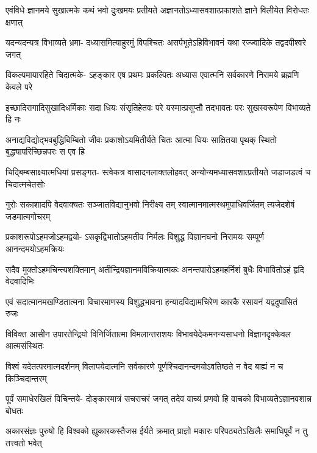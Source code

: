 \fourlineindentedshloka
{एवंविधे ज्ञानमये सुखात्मके}
{कथं भवो दुःखमयः प्रतीयते}
{अज्ञानतोऽध्यासवशात्प्रकाशते}
{ज्ञाने विलीयेत विरोधतः क्षणात्} %

\fourlineindentedshloka
{यदन्यदन्यत्र विभाव्यते भ्रमा-}
{दध्यासमित्याहुरमुं विपश्चितः}
{असर्पभूतेऽहिविभावनं यथा}
{रज्ज्वादिके तद्वदपीश्वरे जगत्} %

\fourlineindentedshloka
{विकल्पमायारहिते चिदात्मके-}
{ऽहङ्कार एष प्रथमः प्रकल्पितः}
{अध्यास एवात्मनि सर्वकारणे}
{निरामये ब्रह्मणि केवले परे} %

\fourlineindentedshloka
{इच्छादिरागादिसुखादिधर्मिकाः}
{सदा धियः संसृतिहेतवः परे}
{यस्मात्प्रसुप्तौ तदभावतः परः}
{सुखस्वरूपेण विभाव्यते हि नः} %

\fourlineindentedshloka
{अनाद्यविद्योद्भवबुद्धिबिम्बितो}
{जीवः प्रकाशोऽयमितीर्यते चितः}
{आत्मा धियः साक्षितया पृथक् स्थितो}
{बुद्ध्यापरिच्छिन्नपरः स एव हि} %

\fourlineindentedshloka
{चिद्बिम्बसाक्ष्यात्मधियां प्रसङ्गत-}
{स्त्वेकत्र वासादनलाक्तलोहवत्}
{अन्योन्यमध्यासवशात्प्रतीयते}
{जडाजडत्वं च चिदात्मचेतसोः} %

\fourlineindentedshloka
{गुरोः सकाशादपि वेदवाक्यतः}
{सञ्जातविद्यानुभवो निरीक्ष्य तम्}
{स्वात्मानमात्मस्थमुपाधिवर्जितम्}
{त्यजेदशेषं जडमात्मगोचरम्} %

\fourlineindentedshloka
{प्रकाशरूपोऽहमजोऽहमद्वयो-}
{ऽसकृद्विभातोऽहमतीव निर्मलः}
{विशुद्ध विज्ञानघनो निरामयः}
{सम्पूर्ण आनन्दमयोऽहमक्रियः} %

\fourlineindentedshloka
{सदैव मुक्तोऽहमचिन्त्यशक्तिमान्}
{अतीन्द्रियज्ञानमविक्रियात्मकः}
{अनन्तपारोऽहमहर्निशं बुधैः}
{विभावितोऽहं हृदि वेदवादिभिः} %

\fourlineindentedshloka
{एवं सदात्मानमखण्डितात्मना}
{विचारमाणस्य विशुद्धभावना}
{हन्यादविद्यामचिरेण कारकै}
{रसायनं यद्वदुपासितं रुजः} %

\fourlineindentedshloka
{विविक्त आसीन उपारतेन्द्रियो}
{विनिर्जितात्मा विमलान्तराशयः}
{विभावयेदेकमनन्यसाधनो}
{विज्ञानदृक्केवल आत्मसंस्थितः} %

\fourlineindentedshloka
{विश्वं यदेतत्परमात्मदर्शनम्}
{विलापयेदात्मनि सर्वकारणे}
{पूर्णश्चिदानन्दमयोऽवतिष्ठते}
{न वेद बाह्यं न च किञ्चिदान्तरम्} %

\fourlineindentedshloka
{पूर्वं समाधेरखिलं विचिन्तये-}
{दोङ्कारमात्रं सचराचरं जगत्}
{तदेव वाच्यं प्रणवो हि वाचको}
{विभाव्यतेऽज्ञानवशान्न बोधतः} %

\fourlineindentedshloka
{अकारसंज्ञः पुरुषो हि विश्वको}
{ह्युकारकस्तैजस ईर्यते क्रमात्}
{प्राज्ञो मकारः परिपठ्यतेऽखिलैः}
{समाधिपूर्वं न तु तत्त्वतो भवेत्} %

